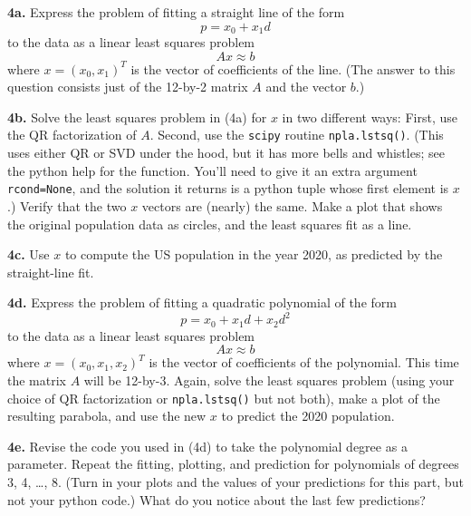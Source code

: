 \documentclass[11pt]{article}
\begin{document}
\par\medskip
{\bf 4a.}
Express the problem of fitting a straight line of the form
$$ p = x_0 + x_1d$$
to the data as a linear least squares problem
$$A x \approx b$$
where $x = (x_0, x_1)^T$ is the vector of coefficients of the line.
(The answer to this question consists just of the 12-by-2 matrix $A$ 
and the vector $b$.)

\par\medskip
{\bf 4b.}
Solve the least squares problem in (4a) for $x$ in two different ways:
First, use the QR factorization of $A$.
Second, use the {\tt scipy} routine {\tt npla.lstsq()}.
(This uses either QR or SVD under the hood, but it has more
bells and whistles; see the python help for the function.
You'll need to give it an extra argument {\tt rcond=None},
and the solution it returns is a python tuple whose first element is $x$.)
Verify that the two $x$ vectors are (nearly) the same.
Make a plot that shows the original population data as circles,
and the least squares fit as a line.

\par\medskip
{\bf 4c.}
Use $x$ to compute the US population in the year 2020, 
as predicted by the straight-line fit.

\par\medskip
{\bf 4d.}
Express the problem of fitting a quadratic polynomial of the form
$$ p = x_0 + x_1d + x_2d^2 $$
to the data as a linear least squares problem
$$A x \approx b$$
where $x = (x_0, x_1, x_2)^T$ is the vector of coefficients of the polynomial.
This time the matrix $A$ will be 12-by-3.
Again, solve the least squares problem 
(using your choice of QR factorization or {\tt npla.lstsq()} but not both),
make a plot of the resulting parabola, 
and use the new $x$ to predict the 2020 population.

\par\medskip
{\bf 4e.}
Revise the code you used in (4d) to take the polynomial degree as a parameter.
Repeat the fitting, plotting, and prediction 
for polynomials of degrees 3, 4, \ldots, 8.
(Turn in your plots and the values of your predictions for this part,
but not your python code.)
What do you notice about the last few predictions?
\end{document}
